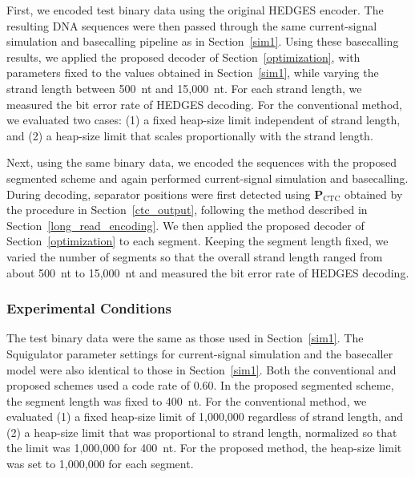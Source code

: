 \documentclass[sotsuron]{kuee}
\begin{document}
First, we encoded test binary data using the original HEDGES encoder.
The resulting DNA sequences were then passed through the same current-signal simulation and basecalling
pipeline as in Section~\ref{sim1}.
Using these basecalling results, we applied the proposed decoder of Section~\ref{optimization}, with
parameters fixed to the values obtained in Section~\ref{sim1}, while varying the strand length between
500~nt and 15,000~nt.
For each strand length, we measured the bit error rate of HEDGES decoding.
For the conventional method, we evaluated two cases: (1) a fixed heap-size limit independent of strand length,
and (2) a heap-size limit that scales proportionally with the strand length.

Next, using the same binary data, we encoded the sequences with the proposed segmented scheme and again
performed current-signal simulation and basecalling.
During decoding, separator positions were first detected using $\bm{P}_{\mathrm{CTC}}$ obtained by the
procedure in Section~\ref{ctc_output}, following the method described in Section~\ref{long_read_encoding}.
We then applied the proposed decoder of Section~\ref{optimization} to each segment.
Keeping the segment length fixed, we varied the number of segments so that the overall strand length ranged
from about 500~nt to 15,000~nt and measured the bit error rate of HEDGES decoding.

\subsubsection{Experimental Conditions}
The test binary data were the same as those used in Section~\ref{sim1}.
The Squigulator parameter settings for current-signal simulation and the basecaller model were also identical
to those in Section~\ref{sim1}.
Both the conventional and proposed schemes used a code rate of 0.60.
In the proposed segmented scheme, the segment length was fixed to 400~nt.
For the conventional method, we evaluated (1) a fixed heap-size limit of 1,000,000 regardless of strand length,
and (2) a heap-size limit that was proportional to strand length, normalized so that the limit was 1,000,000
for 400~nt.
For the proposed method, the heap-size limit was set to 1,000,000 for each segment.
\end{document}
